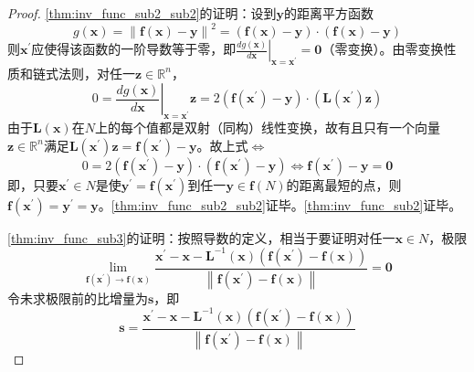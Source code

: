 \documentclass[main.tex]{subfiles}
\begin{document}
\begin{proof}
    \ref{thm:inv_func_sub2_sub2}的证明：设到$\mathbf{y}$的距离平方函数
    \[
        g\left(\mathbf{x}\right)=\left\|\mathbf{f}\left(\mathbf{x}\right)-\mathbf{y}\right\|^2=\left(\mathbf{f}\left(\mathbf{x}\right)-\mathbf{y}\right)\cdot\left(\mathbf{f}\left(\mathbf{x}\right)-\mathbf{y}\right)\]
    则$\mathbf{x}^\prime$应使得该函数的一阶导数等于零，即$\left.\frac{dg\left(\mathbf{x}\right)}{d\mathbf{x}}\right|_{\mathbf{x}=\mathbf{x}^\prime}=\mathbf{0}$（零变换）。由零变换性质和链式法则，对任一$\mathbf{z}\in\mathbb{R}^n$，
    \[0=\left.\frac{dg\left(\mathbf{x}\right)}{d\mathbf{x}}\right|_{\mathbf{x}=\mathbf{x}^\prime}\mathbf{z}=2\left(\mathbf{f}\left(\mathbf{x}^\prime\right)-\mathbf{y}\right)\cdot\left(\mathbf{L}\left(\mathbf{x}^\prime\right)\mathbf{z}\right)\]
    由于$\mathbf{L}\left(\mathbf{x}\right)$在$N$上的每个值都是双射（同构）线性变换，故有且只有一个向量$\mathbf{z}\in\mathbb{R}^n$满足$\mathbf{L}\left(\mathbf{x}^\prime\right)\mathbf{z}=\mathbf{f}\left(\mathbf{x}^\prime\right)-\mathbf{y}$。故上式$\Leftrightarrow$
    \[0=2\left(\mathbf{f}\left(\mathbf{x}^\prime\right)-\mathbf{y}\right)\cdot\left(\mathbf{f}\left(\mathbf{x}^\prime\right)-\mathbf{y}\right)\Leftrightarrow\mathbf{f}\left(\mathbf{x}^\prime\right)-\mathbf{y}=\mathbf{0}\]
    即，只要$\mathbf{x}^\prime\in N$是使$\mathbf{y}^\prime=\mathbf{f}\left(\mathbf{x}^\prime\right)$到任一$\mathbf{y}\in \mathbf{f}\left(N\right)$的距离最短的点，则$\mathbf{f}\left(\mathbf{x}^\prime\right)=\mathbf{y}^\prime=\mathbf{y}$。\ref{thm:inv_func_sub2_sub2}证毕。\ref{thm:inv_func_sub2}证毕。

    \ref{thm:inv_func_sub3}的证明：按照导数的定义，相当于要证明对任一$\mathbf{x}\in N$，极限
    \[\lim_{\mathbf{f}\left(\mathbf{x}^\prime\right)\to\mathbf{f}\left(\mathbf{x}\right)}\frac{\mathbf{x}^\prime-\mathbf{x}-\mathbf{L}^{-1}\left(\mathbf{x}\right)\left(\mathbf{f}\left(\mathbf{x}^\prime\right)-\mathbf{f}\left(\mathbf{x}\right)\right)}{\left\|\mathbf{f}\left(\mathbf{x}^\prime\right)-\mathbf{f}\left(\mathbf{x}\right)\right\|}=\mathbf{0}\]
    令未求极限前的比增量为$\mathbf{s}$，即
    \[\mathbf{s}=\frac{\mathbf{x}^\prime-\mathbf{x}-\mathbf{L}^{-1}\left(\mathbf{x}\right)\left(\mathbf{f}\left(\mathbf{x}^\prime\right)-\mathbf{f}\left(\mathbf{x}\right)\right)}{\left\|\mathbf{f}\left(\mathbf{x}^\prime\right)-\mathbf{f}\left(\mathbf{x}\right)\right\|}\]


\end{proof}
\end{document}
